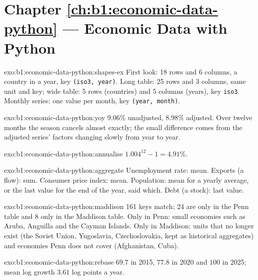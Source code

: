 \section*{Chapter \ref{ch:b1:economic-data-python} --- Economic Data with Python}

\begin{solution}{exo:b1:economic-data-python:shapes-ex}
First look: 18 rows and 6 columns, a country in a year, key \texttt{(iso3, year)}.
Long table: 25 rows and 3 columns, same unit and key; wide table: 5 rows
(countries) and 5 columns (years), key \texttt{iso3}. Monthly series: one value per
month, key \texttt{(year, month)}.
\end{solution}

\begin{solution}{exo:b1:economic-data-python:yoy}
$9.06\%$ unadjusted, $8.98\%$ adjusted. Over twelve months the season cancels
almost exactly; the small difference comes from the adjusted series'
factors changing slowly from year to year.
\end{solution}

\begin{solution}{exo:b1:economic-data-python:annualise}
$1.004^{12} - 1 = 4.91\%$.
\end{solution}

\begin{solution}{exo:b1:economic-data-python:aggregate}
Unemployment rate: mean. Exports (a flow): sum. Consumer price index: mean.
Population: mean for a yearly average, or the last value for the end of
the year, said which. Debt (a stock): last value.
\end{solution}

\begin{solution}{exo:b1:economic-data-python:maddison}
161 keys match; 24 are only in the Penn table and 8 only in the Maddison
table. Only in Penn: small economies such as Aruba, Anguilla and the Cayman
Islands. Only in Maddison: units that no longer exist (the Soviet Union,
Yugoslavia, Czechoslovakia, kept as historical aggregates) and economies
Penn does not cover (Afghanistan, Cuba).
\end{solution}

\begin{solution}{exo:b1:economic-data-python:rebase}
$69.7$ in 2015, $77.8$ in 2020 and $100$ in 2025; mean log growth $3.61$ log points a
year.
\end{solution}

